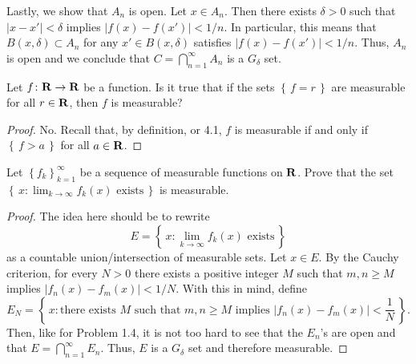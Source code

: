 Lastly, we show that $A_n$ is open. Let $x\in A_n$. Then there exists
$\delta>0$ such that $|x-x'|<\delta$ implies $|f(x)-f(x')|<1/n$. In
particular, this means that $B(x,\delta)\subset A_n$ for any $x'\in
B(x,\delta)$ satisfies $|f(x)-f(x')|<1/n$. Thus, $A_n$ is open and we
conclude that $C=\bigcap_{n=1}^\infty A_n$ is a $G_\delta$ set.
\begin{problem}
Let $f\colon\mathbf{R}\to\mathbf{R}$ be a function. Is it true that if the sets
$\left\{\,f=r\,\right\}$ are measurable for all $r\in\mathbf{R}$, then $f$ is
measurable?
\end{problem}
\begin{proof}
No. Recall that, by definition, or 4.1, $f$ is measurable if and only if
$\left\{\,f>a\,\right\}$ for all $a\in\mathbf{R}$.
\end{proof}

\begin{problem}
Let $\left\{f_k\right\}_{k=1}^\infty$ be a sequence of measurable functions
on $\mathbf{R}$. Prove that the set
$\left\{\,x:\text{$\lim_{k\to\infty} f_k(x)$ exists}\,\right\}$
is measurable.
\end{problem}
\begin{proof}
The idea here should be to rewrite
\begin{equation}
  \label{eq:measurable-lim-set}
E=\left\{\,x:\text{$\lim_{k\to\infty} f_k(x)$ exists}\,\right\}
\end{equation}
as a countable union/intersection of measurable sets. Let $x\in E$. By the
Cauchy criterion, for every $N>0$ there exists a positive integer
$M$ such that $m,n\geq M$ implies
$\left|f_n(x)-f_m(x)\right|<1/N$. With this in mind, define
\begin{equation}
  \label{eq:countable-lim-set}
E_N=
\left\{\,
x:\text{there exists $M$ such that $m,n\geq M$ implies $\left|f_n(x)-f_m(x)\right|<\frac{1}{N}$}
\,\right\}.
\end{equation}
Then, like for Problem 1.4, it is not too hard to see that the $E_n$'s are
open and that $E=\bigcap_{n=1}^\infty E_n$. Thus, $E$ is a $G_\delta$ set
and therefore measurable.
\end{proof}

